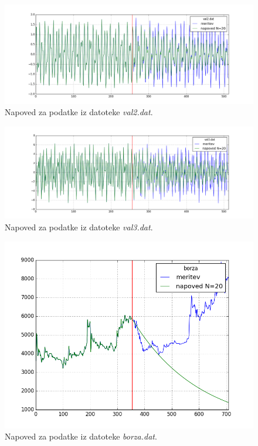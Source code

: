 \documentclass[slovene,11pt,a4paper]{article}
\numberwithin{equation}{section} %
\numberwithin{figure}{section} %
\numberwithin{table}{section} %
\begin{document}
\begin{figure}[!h]
\centering
\includegraphics[scale=0.4]{slike/napoved_val2_2.png}
\caption{Napoved za podatke iz datoteke \textsl{val2.dat}.}
\end{figure}



\begin{figure}[!h]
\centering
\includegraphics[scale=0.4]{slike/napoved_val3_2.png}
\caption{Napoved za podatke iz datoteke \textsl{val3.dat}.}
\end{figure}


\begin{figure}[!h]
\centering
\includegraphics[scale=0.5]{slike/napoved_borza.png}
\caption{Napoved za podatke iz datoteke \textsl{borza.dat}.}
\end{figure}
\end{document}

